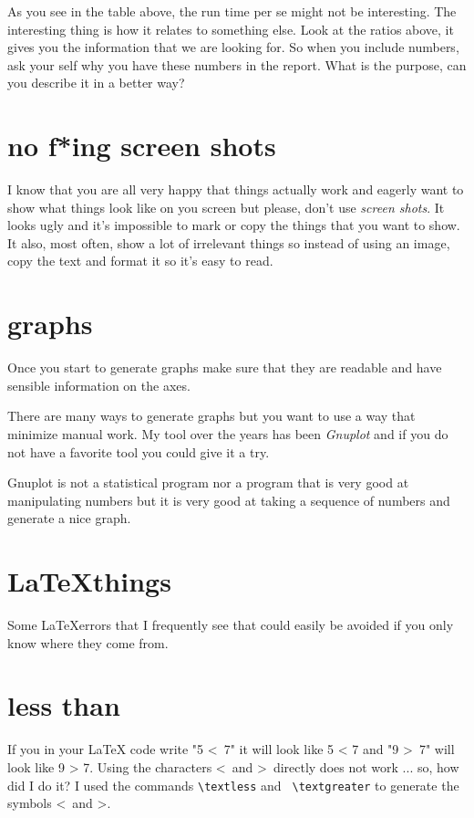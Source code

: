 \documentclass[a4paper,11pt]{article}
\begin{document}
As you see in the table above, the run time per se might not be
interesting. The interesting thing is how it relates to something
else. Look at the ratios above, it gives you the information that we
are looking for. So when you include numbers, ask your self why you
have these numbers in the report. What is the purpose, can you
describe it in a better way?


\section*{no f*ing screen shots}

I know that you are all very happy that things actually work and
eagerly want to show what things look like on you screen but please,
don't use {\em screen shots}. It looks ugly and it's impossible to mark or
copy the things that you want to show. It also, most often, show a lot
of irrelevant things so instead of using an image, copy the text and
format it so it's easy to read.

\section*{graphs}

Once you start to generate graphs make sure that they are readable and
have sensible information on the axes. 

There are many ways to generate graphs but you want to
use a way that minimize manual work. My tool over the years has been
{\em Gnuplot} and if you do not have a favorite tool you could give it
a try.

Gnuplot is not a statistical program nor a program that is very good at
manipulating numbers but it is very good at taking a sequence of
numbers and generate a nice graph.

\section*{\LaTeX things}

Some \LaTeX errors that I frequently see that could easily be avoided
if you only know where they come from.

\section*{less than}

If you in your LaTeX code write "5 \textless\ 7" it will look like 5 <
7 and "9 \textgreater\ 7" will look like 9 > 7. Using the characters
\textless\ and \textgreater\ directly does not work ... so, how did I
do it?  I used the commands {\tt  \textbackslash textless} and {\tt
  \textbackslash textgreater} to generate the symbols \textless\ and
\textgreater.
\end{document}
